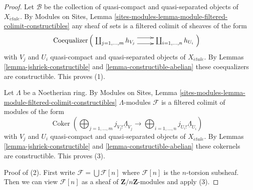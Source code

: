 \documentclass[10pt,a4paper]{amsart}
\theoremstyle{plain}
\theoremstyle{definition}
\theoremstyle{remark}
\numberwithin{equation}{subsection}
\def\etale{{\acute{e}tale}}
\def\Coker{\mathop{\mathrm{Coker}}}
\begin{document}
\begin{proof}
Let $\mathcal{B}$ be the collection of quasi-compact and quasi-separated
objects of $X_\etale$. By Modules on Sites,
Lemma \ref{sites-modules-lemma-module-filtered-colimit-constructibles}
any sheaf of sets is a filtered colimit of sheaves of the form
$$
\text{Coequalizer}\left(
\xymatrix{
\coprod\nolimits_{j = 1, \ldots, m} h_{V_j}
\ar@<1ex>[r] \ar@<-1ex>[r] &
\coprod\nolimits_{i = 1, \ldots, n} h_{U_i}
}
\right)
$$
with $V_j$ and $U_i$ quasi-compact and quasi-separated objects
of $X_\etale$. By
Lemmas \ref{lemma-jshriek-constructible} and \ref{lemma-constructible-abelian}
these coequalizers are constructible. This proves (1).

\medskip\noindent
Let $\Lambda$ be a Noetherian ring.
By Modules on Sites,
Lemma \ref{sites-modules-lemma-module-filtered-colimit-constructibles}
$\Lambda$-modules $\mathcal{F}$ is a filtered colimit
of modules of the form
$$
\Coker\left(
\bigoplus\nolimits_{j = 1, \ldots, m} j_{V_j!}\underline{\Lambda}_{V_j}
\longrightarrow
\bigoplus\nolimits_{i = 1, \ldots, n} j_{U_i!}\underline{\Lambda}_{U_i}
\right)
$$
with $V_j$ and $U_i$ quasi-compact and quasi-separated objects
of $X_\etale$. By
Lemmas \ref{lemma-jshriek-constructible} and \ref{lemma-constructible-abelian}
these cokernels are constructible. This proves (3).

\medskip\noindent
Proof of (2). First write $\mathcal{F} = \bigcup \mathcal{F}[n]$ where
$\mathcal{F}[n]$ is the $n$-torsion subsheaf. Then we can view
$\mathcal{F}[n]$ as a sheaf of $\mathbf{Z}/n\mathbf{Z}$-modules
and apply (3).
\end{proof}
\end{document}
